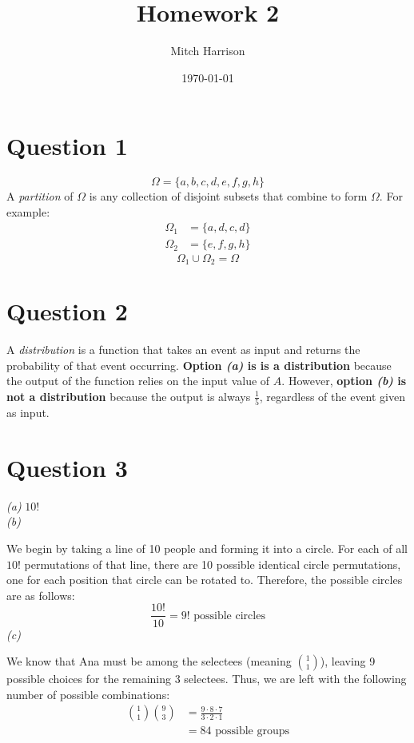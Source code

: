 \documentclass[titlepage, 12pt, leqno]{article}
\title{\Huge{Homework 2}}
\author{\large{Mitch Harrison}}
\date{\today}
\begin{document}
\setlength{\parskip}{1\baselineskip}
\setlength{\parindent}{15pt}
\maketitle
\tableofcontents
\newpage


\section{Question 1}

\[
\Omega = \{a,b,c,d,e,f,g,h\}
\]
A \textit{partition} of $\Omega$ is any collection of disjoint subsets that combine to form $\Omega$. For example:
\begin{align*}
    \Omega_1 &= \{a,d,c,d\} \\
    \Omega_2 &= \{e,f,g,h\}
\end{align*}
\[
    \boxed{\Omega_1 \cup \Omega_2 = \Omega} 
\]
\pagebreak
\section{Question 2}
A \textit{distribution} is a function that takes an event as input and returns the probability of that event occurring. \textbf{Option \textit{(a)} is is a distribution} because the output of the function relies on the input value of $A$. However, \textbf{option \textit{(b)} is not a distribution} because the output is always $\frac{1}{5}$, regardless of the event given as input.

\pagebreak
\section{Question 3}
\textit{(a)} $\boxed{10!}$ \\[.1in]
\textit{(b)} 

We begin by taking a line  of 10 people and forming it into a circle. For each of all $10!$ permutations of that line, there are 10 possible identical circle permutations, one for each position that circle can be rotated to. Therefore, the possible circles are as follows:
\[
    \frac{10!}{10} = \boxed{9! \text{ possible circles}}
\]
\textit{(c)} 

We know that Ana must be among the selectees (meaning $\binom{1}{1}$), leaving 9 possible choices for the remaining 3 selectees. Thus, we are left with the following number of possible combinations:
\begin{align*}
    \binom{1}{1} \binom{9}{3} &= \frac{9 \cdot 8 \cdot 7}{3 \cdot 2 \cdot 1} \\
                              &= \boxed{84 \text{ possible groups}}
\end{align*}
\end{document}

